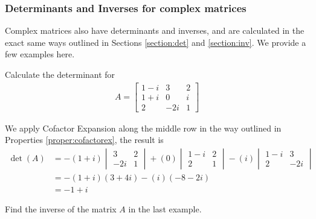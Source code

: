 \subsubsection{Determinants and Inverses for complex matrices}
Complex matrices also have determinants and inverses, and are calculated in the exact same ways outlined in Sections \ref{section:det} and \ref{section:inv}. We provide a few examples here.

\begin{exmp}
Calculate the determinant for
\begin{align*}
A = 
\begin{bmatrix}
1-i & 3 & 2 \\
1+i & 0 & i \\
2 & -2i & 1
\end{bmatrix}
\end{align*}
\end{exmp}
\begin{solution}
We apply Cofactor Expansion along the middle row in the way outlined in Properties \ref{proper:cofactorex}, the result is
\begin{align*}
\det(A) &= -(1+i)
\begin{vmatrix}
3 & 2 \\
-2i & 1
\end{vmatrix}
+ (0)
\begin{vmatrix}
1-i & 2 \\
2 & 1
\end{vmatrix}
- (i)
\begin{vmatrix}
1-i & 3 \\
2 & -2i
\end{vmatrix} \\
&= -(1+i)(3+4i) - (i)(-8-2i) \\
&= -1 + i
\end{align*}  
\end{solution}

\begin{exmp}
Find the inverse of the matrix $A$ in the last example.
\end{exmp}

